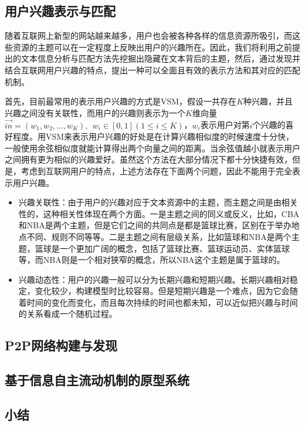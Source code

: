 \subsection{用户兴趣表示与匹配}
随着互联网上新型的网站越来越多，用户也会被各种各样的信息资源所吸引，而这些资源的主题可以在一定程度上反映出用户的兴趣所在。因此，我们将利用之前提出的文本信息分析与匹配方法先挖掘出隐藏在文本背后的主题，然后，通过发现并结合互联网用户兴趣的特点，提出一种可以全面且有效的表示方法和其对应的匹配机制。

首先，目前最常用的表示用户兴趣的方式是VSM，假设一共存在$K$种兴趣，并且兴趣之间没有关联性，而用户的兴趣则表示为一个$K$维向量$\vec{in}=(w_1,w_2,...,w_K),~~w_i\in [0,1](1\le i\le K)$，$w_i$表示用户对第$i$个兴趣的喜好程度。用VSM来表示用户兴趣的好处是在计算兴趣相似度的时候速度十分快，一般使用余弦相似度就能计算得出两个向量之间的距离。当余弦值越小就表示用户之间拥有更为相似的兴趣爱好。虽然这个方法在大部分情况下都十分快捷有效，但是，考虑到互联网用户的特点，上述方法存在下面两个问题，因此不能用于完全表示用户兴趣。
\begin{itemize}
  \item 兴趣关联性：由于用户的兴趣对应于文本资源中的主题，而主题之间是由相关性的，这种相关性体现在两个方面。一是主题之间的同义或反义，比如，CBA和NBA是两个主题，但是它们之间的共同点是都是篮球比赛，区别在于举办地点不同、规则不同等等。二是主题之间有层级关系，比如篮球和NBA是两个主题，篮球是一个更加广阔的概念，包括了篮球比赛、篮球运动员、实体篮球等，而NBA则是一个相对狭窄的概念，所以NBA这个主题是属于篮球的。
  \item 兴趣动态性：用户的兴趣一般可以分为长期兴趣和短期兴趣。长期兴趣相对稳定，变化较少，构建模型时比较容易。但是短期兴趣是一个难点，因为它会随着时间的变化而变化，而且每次持续的时间也都未知，可以近似把兴趣与时间的关系看成一个随机过程。
\end{itemize}



\subsection{P2P网络构建与发现}

\subsection{基于信息自主流动机制的原型系统}

\subsection{小结}
